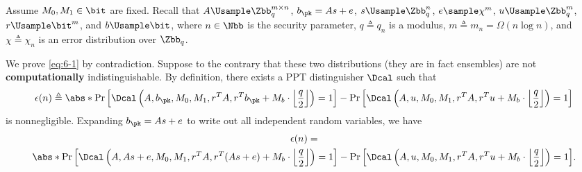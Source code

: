 \begin{answer}[i]
    Assume $M_0, M_1\in \bit$ are fixed. Recall that $A\Usample\Zbb_q^{m\times n}$, $b_\pk=As+e$, $s\Usample\Zbb_q^n$, $e\sample\chi^m$, $u\Usample\Zbb_q^m$, $r\Usample\bit^m$, and $b\Usample\bit$, where $n\in\Nbb$ is the security parameter, $q\triangleq q_n$ is a modulus, $m\triangleq m_n= \Omega(n\log n)$, and $\chi\triangleq \chi_n$ is an error distribution over $\Zbb_q$. 
   
    We prove \eqref{eq:6-1} by contradiction. Suppose to the contrary that these two distributions (they are in fact ensembles) are not \textbf{computationally} indistinguishable. By definition, there exists a PPT distinguisher $\Dcal$ such that
    \begin{multline*}
        \epsilon(n)\triangleq
        \abs*{\Pr\left[\Dcal\left(A, b_\pk, M_0, M_1, r^TA, r^Tb_\pk + M_b \cdot \left\lfloor\frac{q}{2}\right\rfloor\right)=1\right]
        - 
        \Pr\left[\Dcal\left(A, u, M_0, M_1, r^TA, r^Tu + M_b \cdot \left\lfloor\frac{q}{2}\right\rfloor\right)=1\right]}
    \end{multline*}
    is nonnegligible.
    Expanding $b_\pk = As + e$ to write out all independent random variables, we have
    \begin{multline}\label{eq:p6-1-1}
        \epsilon(n)=\\
        \abs*{\Pr\left[\Dcal\left(A, As+e, M_0, M_1, r^TA, r^T(As+e) + M_b \cdot \left\lfloor\frac{q}{2}\right\rfloor\right)=1\right]
        - 
        \Pr\left[\Dcal\left(A, u, M_0, M_1, r^TA, r^Tu + M_b \cdot \left\lfloor\frac{q}{2}\right\rfloor\right)=1\right]}.
    \end{multline}


\end{answer}
